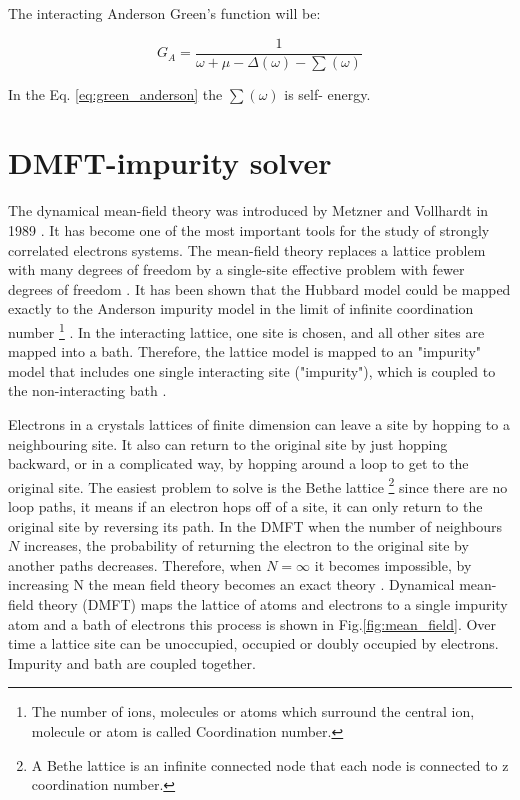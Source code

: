\noindent The interacting Anderson Green's function will be: 

\begin{equation} \label{eq:green_anderson}
    G_{A} =\frac{1}{\omega + \mu-\Delta(\omega)-\sum(\omega)}
\end{equation}

\noindent In the Eq. \ref{eq:green_anderson} the $\sum(\omega)$ is self- energy. 

\section{DMFT-impurity solver}

The dynamical mean-field theory was introduced by Metzner and Vollhardt in 1989 \cite{Walter}. It has become one of the most important tools for the study of strongly correlated electrons systems. The mean-field theory replaces a lattice problem with many degrees of freedom by a single-site effective problem with fewer degrees of freedom \cite{Antoine}. It has been shown that the Hubbard model could be mapped exactly to the Anderson impurity model in the limit of infinite coordination number \footnote{The number of ions, molecules or atoms which surround the central ion, molecule or atom is called Coordination number.} \cite{Walter}. In the interacting lattice, one site is chosen, and all other sites are mapped into a bath. Therefore, the lattice model is mapped to an "impurity" model that includes one single interacting site ("impurity"), which is coupled to the non-interacting bath \cite{Antoine}.


Electrons in a crystals lattices of finite dimension can leave a site by hopping to a neighbouring site. It also can return to the original site by just hopping backward, or in a complicated way, by hopping around a loop to get to the original site. The easiest problem to solve is the Bethe lattice \footnote{A Bethe lattice is an infinite connected node that each node is connected to z coordination number.} since there are no loop paths, it means if an electron hops off of a site, it can only return to the original site by reversing its path. In the DMFT when the number of neighbours $N$ increases, the probability of returning the electron to the original site by another paths decreases. Therefore, when $N=\infty$ it becomes impossible, by increasing N the mean field theory becomes an exact theory \cite{Mahan}. Dynamical mean-field theory (DMFT) maps the lattice of atoms and electrons to a single impurity atom and a bath of electrons this process is shown in  Fig.\ref{fig:mean_field}. Over time a lattice site can be unoccupied, occupied or doubly occupied by electrons. Impurity and bath are coupled together.



